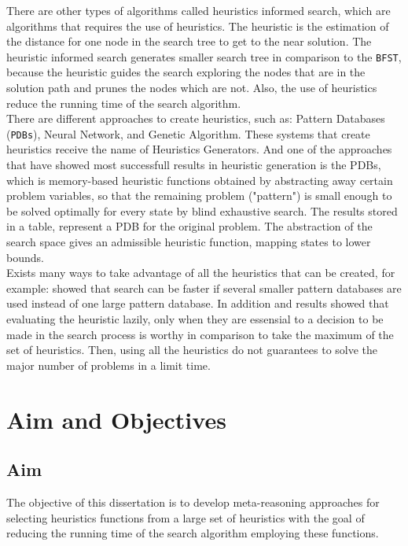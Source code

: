 There are other types of algorithms called heuristics informed search, which are algorithms that requires the use of heuristics. The heuristic is the estimation of the distance for one node in the search tree to get to the near solution. The heuristic informed search generates smaller search tree in comparison to the \texttt{BFST}, because the heuristic guides the search exploring the nodes that are in the solution path and prunes the nodes which are not. Also, the use of heuristics reduce the running time of the search algorithm. \\

There are different approaches to create heuristics, such as: Pattern Databases (\texttt{PDBs}), Neural Network, and Genetic Algorithm. These systems that create heuristics receive the name of Heuristics Generators. And one of the approaches that have showed most successfull results in heuristic generation is the PDBs, which is memory-based heuristic functions obtained by abstracting away certain problem variables, so that the remaining problem ("pattern") is small enough to be solved optimally for every state by blind exhaustive search. The results stored in a table, represent a PDB for the original problem. The abstraction of the search space gives an admissible heuristic function, mapping states to lower bounds. \\

Exists many ways to take advantage of all the heuristics that can be created, for example: \cite{holte2006maximizing} showed that search can be faster if several smaller pattern databases are used instead of one large pattern database. In addition \cite{domshlak2010max} and \cite{tolpin2013towards} results showed that evaluating the heuristic lazily, only when they are essensial to a decision to be made in the search process is worthy in comparison to take the maximum of the set of heuristics. Then, using all the heuristics do not guarantees to solve the major number of problems in a limit time.
\section{Aim and Objectives}
\subsection{Aim}
\noindent
The objective of this dissertation is to develop meta-reasoning approaches for selecting heuristics functions from a large set of heuristics with the goal of reducing the running time of the search algorithm employing these functions.

